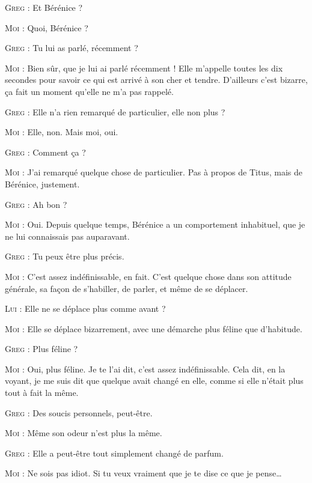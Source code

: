 \begin{dialogue}

\textsc{Greg} : Et Bérénice ?

\textsc{Moi} : Quoi, Bérénice ?

\textsc{Greg} : Tu lui as parlé, récemment ?

\textsc{Moi} : Bien sûr, que je lui ai parlé récemment ! Elle m’appelle toutes les dix secondes pour savoir ce qui est arrivé à son cher et tendre. D’ailleurs c’est bizarre, ça fait un moment qu’elle ne m’a pas rappelé.

\textsc{Greg} : Elle n’a rien remarqué de particulier, elle non plus ?

\textsc{Moi} : Elle, non. Mais moi, oui.

\textsc{Greg} : Comment ça ?

\textsc{Moi} : J’ai remarqué quelque chose de particulier. Pas à propos de Titus, mais de Bérénice, justement.

\textsc{Greg} : Ah bon ?

\illusloflabel{}%
%
%
\textsc{Moi} : Oui. Depuis quelque temps, Bérénice a un comportement inhabituel, que je ne lui connaissais pas auparavant.

\textsc{Greg} : Tu peux être plus précis.

\textsc{Moi} : C’est assez indéfinissable, en fait. C’est quelque chose dans son attitude générale, sa façon de s’habiller, de parler, et même de se déplacer.

\textsc{Lui} : Elle ne se déplace plus comme avant ?

\textsc{Moi} : Elle se déplace bizarrement, avec une démarche plus féline que d’habitude.

\textsc{Greg} : Plus féline ?

\textsc{Moi} : Oui, plus féline. Je te l’ai dit, c’est assez indéfinissable. Cela dit, en la voyant, je me suis dit que quelque avait changé en elle, comme si elle n’était plus tout à fait la même.

\textsc{Greg} : Des soucis personnels, peut-être.

\textsc{Moi} : Même son odeur n’est plus la même.

\textsc{Greg} : Elle a peut-être tout simplement changé de parfum.

\textsc{Moi} : Ne sois pas idiot. Si tu veux vraiment que je te dise ce que je pense…


\end{dialogue}

